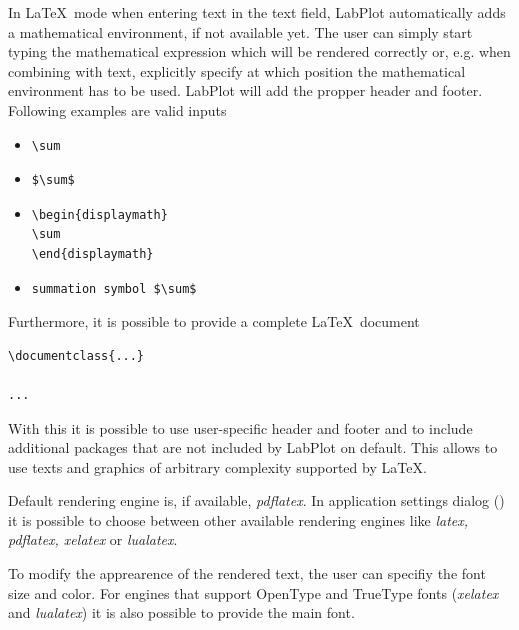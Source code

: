 In \LaTeX\, mode when entering text in the text field, LabPlot automatically adds a mathematical environment, if not available yet. The user can simply start typing the mathematical expression which will be rendered correctly or, e.g. when combining with text, explicitly specify at which position the mathematical environment has to be used. LabPlot will add the propper header and footer. Following examples are valid inputs
\begin{itemize}
\item {
\begin{lstlisting}
\sum
\end{lstlisting}
}
%
\item {
\begin{lstlisting}
$\sum$
\end{lstlisting}
}
%
\item {
\begin{lstlisting}
\begin{displaymath}
\sum
\end{displaymath}
\end{lstlisting}
}
%
\item {
\begin{lstlisting}
summation symbol $\sum$
\end{lstlisting}
}
\end{itemize}
Furthermore, it is possible to provide a complete \LaTeX\, document
\begin{lstlisting}[language={[Latex]TeX}, backgroundcolor=\color{lightgray}, frame=single]
\documentclass{...}

...

\end{lstlisting}

With this it is possible to use user-specific header and footer and to include additional packages that are not included by LabPlot on default. This allows to use texts and graphics of arbitrary complexity supported by \LaTeX.

Default rendering engine is, if available, \textit{pdflatex}. In application settings dialog () it is possible to choose between other available rendering engines like \textit{latex, pdflatex, xelatex} or \textit{lualatex}.

To modify the apprearence of the rendered text, the user can specifiy the font size and color. For engines that support OpenType and TrueType fonts (\textit{xelatex} and \textit{lualatex}) it is also possible to provide the main font.


